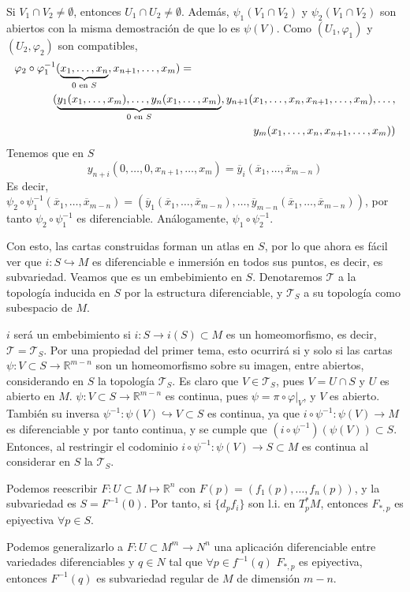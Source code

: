 \begin{dem}
Si $V_1\cap V_2 \neq \emptyset$, entonces $U_1 \cap U_2 \neq \emptyset$. Además, $\psi_1(V_1\cap V_2)$ y $\psi_2(V_1\cap V_2)$ son abiertos con la misma demostración de que lo es $\psi(V)$. Como $(U_1,\varphi_1)$ y $(U_2,\varphi_2)$ son compatibles, \[\begin{split}  \varphi_2\circ \varphi_1^{-1}(\underbrace{x_1,\dots,x_n}_{0 \text{ en }S},x_{n+1},\dots,x_m) = \hspace{65mm} & \\   (\underbrace{y_1(x_1,\dots,x_m),\dots,y_n(x_1,\dots,x_m)}_{0 \text{ en }S},y_{n+1}(x_1,\dots,x_n,x_{n+1},\dots,x_m),\dots, & \\ y_m(x_1,\dots,x_n,x_{n+1},\dots,x_m)) & \end{split}\]
Tenemos que en $S$ $$y_{n+i}(0,\dots,0,x_{n+1},\dots,x_m) = \overline{y}_i(\overline{x}_1,\dots,\overline{x}_{m-n})$$
Es decir, $\psi_2\circ\psi_1^{-1}(\overline{x}_1,\dots,\overline{x}_{m-n}) = (\overline{y}_1(\overline{x}_1,\dots,\overline{x}_{m-n}), \dots, \overline{y}_{m-n}(\overline{x}_1,\dots,\overline{x}_{m-n}))$, por tanto $\psi_2\circ\psi^{-1}_1$ es diferenciable. An\'alogamente, $\psi_1\circ \psi^{-1}_2$. 

Con esto, las cartas construidas forman un atlas en $S$, por lo que ahora es f\'acil ver que $i:S \hookrightarrow M$ es diferenciable e inmersión en todos sus puntos, es decir, es subvariedad. Veamos que es un embebimiento en $S$. Denotaremos $\mathcal{T}$ a la topología inducida en $S$ por la estructura diferenciable, y $\mathcal{T}_S$ a su topología como subespacio de $M$.

$i$ será un embebimiento si $i:S\to i(S) \subset M$ es un homeomorfismo, es decir, $\mathcal{T} = \mathcal{T}_S$. Por una propiedad del primer tema, esto ocurrirá si y solo si las cartas $\psi:V\subset S \to \mathbb{R}^{m-n}$ son un homeomorfismo sobre su imagen, entre abiertos, considerando en $S$ la topología $\mathcal{T}_S$. Es claro que $V \in \mathcal{T}_S$, pues $V = U \cap S$ y $U$ es abierto en $M$. $\psi:V\subset S \to \mathbb{R}^{m-n}$ es continua, pues $\psi=\pi\circ \varphi|_V$, y $V$ es abierto. También su inversa $\psi^{-1}:\psi(V) \hookrightarrow V \subset S$ es continua, ya que $i\circ \psi^{-1}:\psi(V) \to M$ es diferenciable y por tanto continua, y se cumple que $(i\circ \psi^{-1})(\psi(V))\subset S$. Entonces, al restringir el codominio $i\circ \psi^{-1}:\psi(V) \to S \subset M$ es continua al considerar en $S$ la $\mathcal{T}_S$.
\end{dem}\begin{cor}
    Podemos reescribir $F:U\subset M \longmapsto \mathbb R^n$ con $F(p) = (f_1(p),\ldots, f_n(p))$, y la subvariedad es $S=F^{-1}(0)$. Por tanto, si $\{d_pf_i\}$ son l.i. en $T_p^*M$,  entonces $F_{*,p}$ es epiyectiva $\forall p \in S$.

    Podemos generalizarlo a $F: U \subset M^m \longrightarrow N^n$ una aplicaci\'on diferenciable entre variedades diferenciables y $q \in N$ tal que $\forall p \in f^{-1}(q)$ $F_{*,p}$ es epiyectiva, entonces $F^{-1}(q)$ es subvariedad regular de $M$ de dimensi\'on $m-n$. 
\end{cor}

